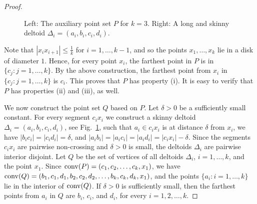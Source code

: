 \documentclass[11pt]{article}
\newcommand{\conv}{{\rm conv}}
\begin{document}
\begin{proof}
\begin{figure}[htbp]
\centerline{\epsfysize=1.5in }
\caption{Left: The auxiliary point set $P$ for $k=3$.
Right: A long and skinny deltoid $\Delta_i=(a_i,b_i,c_i,d_i)$.}
\label{fig:longcycle}
\end{figure}

Note that $|x_ix_{i+1}|\leq \frac{1}{k}$ for $i=1,\ldots, k-1$, and so
the points $x_1,\ldots , x_k$ lie in a disk of diameter $1$.
Hence, for every point $x_i$, the farthest point in $P$ is
in $\{c_j:j=1,\ldots , k\}$. By the above construction, the farthest point from $x_i$
in $\{c_j:j=1,\ldots , k\}$ is $c_i$. This proves that $P$ has property (i). It is easy
to verify that $P$ has properties (ii) and (iii), as well.

We now construct the point set $Q$ based on $P$. Let $\delta>0$ be a sufficiently small
constant. For every segment $c_ix_i$ we construct a skinny deltoid
$\Delta_i=(a_i,b_i,c_i,d_i)$, see Fig.~\ref{fig:longcycle},
such that $a_i\in c_ix_i$ is at distance $\delta$ from $x_i$, we have
$|b_ic_i|=|c_id_i|=\delta$, and $|a_ib_i|=|a_ic_i|=|a_id_i|=|c_ix_i|-\delta$.
Since the segments $c_ix_i$ are pairwise non-crossing and $\delta>0$ is small,
the deltoids $\Delta_i$ are pairwise interior disjoint.
Let $Q$ be the set of vertices of all deltoids $\Delta_i$, $i=1,\ldots , k$, and
the point $x_1$. Since $\conv(P)=(c_1,c_2,\ldots , c_k,x_1)$, we have
$\conv(Q)=(b_1,c_1,d_1,b_2,c_2,d_2,\ldots , b_k,c_k,d_k,x_1)$, and
the points $\{a_i:i=1,\ldots , k\}$ lie in the interior of $\conv(Q)$.
If $\delta>0$ is sufficiently small, then the farthest points from $a_i$ in $Q$
are $b_i$, $c_i$, and $d_i$, for every $i=1,2,\ldots , k$.


\end{proof}
\end{document}
